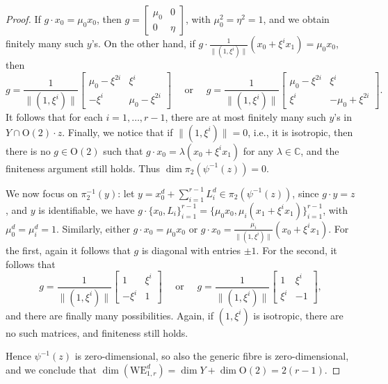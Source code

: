 \documentclass{amsart}
\numberwithin{theorem}{section}
\theoremstyle{definition}
\newcommand{\CC}{\mathbb{C}}
\begin{document}
\begin{proof}
    If $g\cdot x_0=\mu_0 x_0$, then $g=\begin{bmatrix}
        \mu_0 &0\\
        0&\eta
    \end{bmatrix}$, with $\mu_0^2=\eta^2=1$, and we obtain finitely many such $y$'s. On the other hand, if $g\cdot \frac{1}{\|(1,\xi^i)\|}(x_0+\xi^ix_1)=\mu_0 x_0$, then 
    $$
    g=\frac{1}{\|(1,\xi^i)\|}\begin{bmatrix}
       \mu_0-\xi^{2i}&\xi^i\\
       -\xi^i&\mu_0-\xi^{2i}
    \end{bmatrix} \quad \text{ or } \quad g=\frac{1}{\|(1,\xi^i)\|}\begin{bmatrix}
       \mu_0-\xi^{2i}&\xi^i\\
       \xi^i&-\mu_0+\xi^{2i}
    \end{bmatrix}.
    $$
   It follows that for each $i=1,\dots, r-1$, there are at most finitely many such $y$'s in $Y\cap \mathrm{O}(2)\cdot z$. Finally, we notice that if $\|(1,\xi^i)\|=0$, i.e., it is isotropic, then there is no $g\in \mathrm{O}(2)$ such that $g\cdot x_0=\lambda (x_0+\xi^ix_1)$ for any $\lambda\in \CC$, and the finiteness argument still holds. Thus $\dim \pi_2(\psi^{-1}(z))=0$.

    We now focus on $\pi_2^{-1}(y)$: let $y=x_0^d+\sum_{i=1}^{r-1}L_i^d\in \pi_2(\psi^{-1}(z))$, since $g\cdot y=z$, and $y$ is identifiable, we have $g\cdot \{x_0,L_i\}_{i=1}^{r-1}=\{\mu_0x_0,\mu_i(x_1+\xi^ix_1)\}_{i=1}^{r-1}$, with $\mu_0^d=\mu_i^d=1$. Similarly, either $g\cdot x_0=\mu_0x_0$ or $g\cdot x_0=\frac{\mu_i}{\|(1,\xi^i)\|}(x_0+\xi^ix_1)$. For the first, again it follows that $g$ is diagonal with entries $\pm 1$. For the second, it follows that
  $$
 g=\frac{1}{\|(1,\xi^i)\|}\begin{bmatrix}
        1&\xi^i\\
        -\xi^i&1
    \end{bmatrix} \quad \text{ or }  \quad g=\frac{1}{\|(1,\xi^i)\|}\begin{bmatrix}
        1&\xi^i\\
        \xi^i&-1
    \end{bmatrix} ,$$  
    and there are finally many possibilities. Again, if $(1,\xi^i)$ is isotropic, there are no such matrices, and finiteness still holds.

   Hence $\psi^{-1}(z)$ is zero-dimensional, so also the generic fibre is zero-dimensional, and we conclude that $\dim(\mathrm{WE}_{1,r}^d)=\dim Y+\dim \mathrm{O}(2)=2(r-1)$.
    \end{proof}
\end{document}
